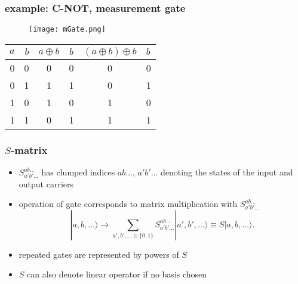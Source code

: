 \documentclass{beamer}
\begin{document}
%
\begin{frame}
    \frametitle{example: C-NOT, measurement gate}
    \begin{figure}
		\centering
        \texttt{[image: mGate.png]}
    \end{figure}
    \begin{table}
        \begin{tabular}{rr|cc|cl}
            $a$&$b$&$a\oplus b$&$b$&$(a\oplus b)\oplus b$&$b$\\
            \hline\hline
            0&0&0&0&0&0\\
            0&1&1&1&0&1\\
            1&0&1&0&1&0\\
            1&1&0&1&1&1
        \end{tabular}
    \end{table}
\end{frame}
%
\begin{frame}
	\frametitle{$S$-matrix}
	\begin{itemize}
		\item $S_{a'b'\ldots}^{ab\ldots}$ has clumped indices $ab\ldots$, $a'b'\ldots$ denoting the states of the input and output carriers
		\item operation of gate corresponds to matrix multiplication with $S_{a'b'\ldots}^{ab\ldots}$
		\begin{equation}
            |a,b,\ldots\rangle\to\sum_{a',b',\ldots\in\{0,1\}} S_{a'b'\ldots}^{ab\ldots}|a',b',\ldots\rangle\equiv S|a,b,\ldots\rangle.
		\end{equation}
		\item repeated gates are represented by powers of $S$
		\item $S$ can also denote linear operator if no basis chosen
	\end{itemize}
\end{frame}
%
\end{document}
